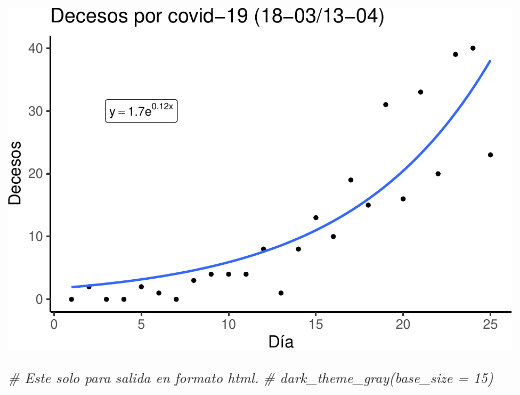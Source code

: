 \documentclass[]{article}
\newenvironment{Shaded}{\begin{snugshade}}{\end{snugshade}}
\newcommand{\CommentTok}[1]{\textcolor[rgb]{0.56,0.35,0.01}{\textit{#1}}}
\begin{document}
\includegraphics{covid19_mx_files/figure-latex/unnamed-chunk-6-1.pdf}

\begin{Shaded}
\begin{Highlighting}[]
\CommentTok{# Este solo para salida en formato html.}
\CommentTok{#  dark_theme_gray(base_size = 15)}
\end{Highlighting}
\end{Shaded}
\end{document}
